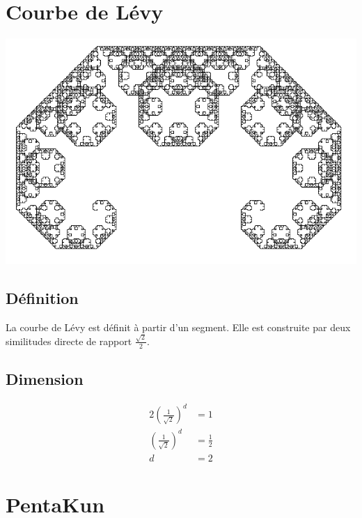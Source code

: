 \documentclass[a4paper, 12pt]{report}
\begin{document}
\newpage
		\section{Courbe de Lévy}
			\begin{center}
				\includegraphics[scale=0.7]{Images/levy}
			\end{center}
			\subsection{Définition}
				La courbe de Lévy est définit à partir d'un segment. Elle est construite par deux similitudes directe de rapport $\frac{\sqrt{2}}{2}$.
			
			\subsection{Dimension}
				\begin{align*}
					 2\left(\frac{1}{\sqrt{2}}\right)^d	&=1\\
					 \left(\frac{1}{\sqrt{2}}\right)^d	&=\frac{1}{2}\\
													d	&=2
				\end{align*}
\newpage
		\section{PentaKun}
		\label{Pentakun}
\end{document}
